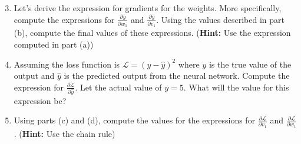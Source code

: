 \begin{enumerate}
    \setcounter{enumi}{2}
    \item {} Let's derive the expression for gradients for the weights. More specifically, compute the expressions for $\frac{\partial \hat{y}}{\partial w_1}$ and $\frac{\partial \hat{y}}{\partial v_1}$. Using the values described in part (b), compute the final values of these expressions. (\textbf{Hint:} Use the expression computed in part (a))
    
    
    
    \item {} Assuming the loss function is $\mathcal{L} = (y - \hat{y})^2$ where $y$ is the true value of the output and $\hat{y}$ is the predicted output from the neural network. Compute the expression for  $\frac{\partial \mathcal{L}}{\partial \hat{y}}$. Let the actual value of $y = 5$. What will the value for this expression be?
    
    
    \item {} Using parts (c) and (d), compute the values for the expressions for $\frac{\partial \mathcal{L}}{\partial v_1}$ and $\frac{\partial \mathcal{L}}{\partial w_1}$. (\textbf{Hint:} Use the chain rule)
    

\end{enumerate}

